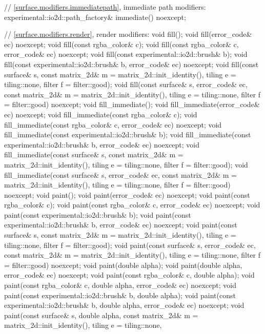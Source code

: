 \begin{codeblock}
{{{{{    // \ref{surface.modifiers.immediatepath}, immediate path modifiers:
    experimental::io2d::path_factory& immediate() noexcept;

    // \ref{surface.modifiers.render}, render modifiers:
    void fill();
    void fill(error_code& ec) noexcept;
    void fill(const rgba_color& c);
    void fill(const rgba_color& c, error_code& ec) noexcept;
    void fill(const experimental::io2d::brush& b);
    void fill(const experimental::io2d::brush& b, error_code& ec) noexcept;
    void fill(const surface& s,
      const matrix_2d& m = matrix_2d::init_identity(), tiling e = tiling::none,
      filter f = filter::good);
    void fill(const surface& s, error_code& ec,
      const matrix_2d& m = matrix_2d::init_identity(), tiling e = tiling::none, 
      filter f = filter::good) noexcept;
    void fill_immediate();
    void fill_immediate(error_code& ec) noexcept;
    void fill_immediate(const rgba_color& c);
    void fill_immediate(const rgba_color& c, error_code& ec) noexcept;
    void fill_immediate(const experimental::io2d::brush& b);
    void fill_immediate(const experimental::io2d::brush& b, error_code& ec)
      noexcept;
    void fill_immediate(const surface& s,
      const matrix_2d& m = matrix_2d::init_identity(), tiling e = tiling::none, 
      filter f = filter::good);
    void fill_immediate(const surface& s, error_code& ec,
      const matrix_2d& m = matrix_2d::init_identity(), tiling e = tiling::none, 
      filter f = filter::good) noexcept;
    void paint();
    void paint(error_code& ec) noexcept;
    void paint(const rgba_color& c);
    void paint(const rgba_color& c, error_code& ec) noexcept;
    void paint(const experimental::io2d::brush& b);
    void paint(const experimental::io2d::brush& b, error_code& ec) noexcept;
    void paint(const surface& s,
      const matrix_2d& m = matrix_2d::init_identity(), tiling e = tiling::none,
      filter f = filter::good);
    void paint(const surface& s, error_code& ec,
      const matrix_2d& m = matrix_2d::init_identity(), tiling e = tiling::none, 
      filter f = filter::good) noexcept;
    void paint(double alpha);
    void paint(double alpha, error_code& ec) noexcept;
    void paint(const rgba_color& c, double alpha);
    void paint(const rgba_color& c, double alpha, error_code& ec) noexcept;
    void paint(const experimental::io2d::brush& b, double alpha);
    void paint(const experimental::io2d::brush& b, double alpha,
      error_code& ec) noexcept;
    void paint(const surface& s, double alpha,
      const matrix_2d& m = matrix_2d::init_identity(), tiling e = tiling::none, 
}}}}}
\end{codeblock}
